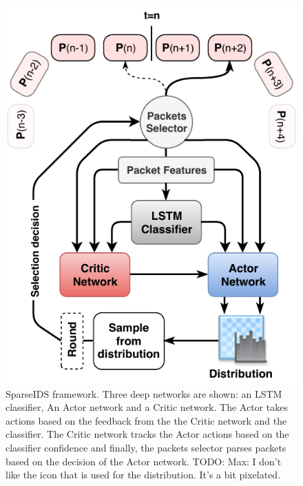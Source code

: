 \documentclass[conference]{IEEEtran}
\newcommand\note[2]{{\color{#1}#2}}
\newcommand\todo[1]{{\note{red}{TODO: #1}}}
\begin{document}
\begin{figure}
\centering
  \includegraphics[width=\columnwidth]{img/rnn-sampling.pdf}
  \caption{SparseIDS framework. Three deep networks are shown: an LSTM classifier, An Actor network and a Critic network. The Actor takes actions based on the feedback from the the Critic network and the classifier. The Critic network tracks the Actor actions based on the classifier confidence and finally, the packets selector parses packets based on the decision of the Actor network. \todo{Max: I don't like the icon that is used for the distribution. It's a bit pixelated.}}
  \label{rnn:sampling}
\end{figure}
\end{document}
